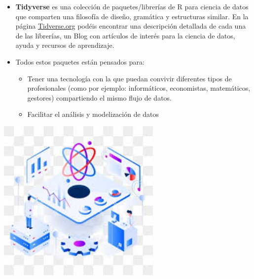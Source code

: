 \documentclass[
  letterpaper,
  DIV=11,
  numbers=noendperiod]{scrreprt}
\begin{document}
\begin{itemize}
\item
  \textbf{Tidyverse} es una colección de paquetes/librerías de R para
  ciencia de datos que comparten una filosofía de diseño, gramática y
  estructuras similar. En la página
  \href{https://www.tidyverse.org/}{Tidverse.org} podéis encontrar una
  descripción detallada de cada una de las librerías, un Blog con
  artículos de interés para la ciencia de datos, ayuda y recursos de
  aprendizaje.
\item
  Todos estos paquetes están pensados para:

  \begin{itemize}
  \item
    Tener una tecnología con la que puedan convivir diferentes tipos de
    profesionales (como por ejemplo: informáticos, economistas,
    matemáticos, gestores) compartiendo el mismo flujo de datos.
  \item
    Facilitar el análisis y modelización de datos
  \end{itemize}
\end{itemize}

\begin{center}
\includegraphics[width=0.6\textwidth,height=\textheight]{Figuras/data_science.png}
\end{center}
\end{document}
